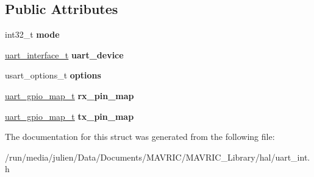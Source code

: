 \subsection*{Public Attributes}
\begin{DoxyCompactItemize}
\item 
\hypertarget{structusart__config__t_a760c7c5f7792f1a8e853808d96127b6b}{int32\+\_\+t {\bfseries mode}}\label{structusart__config__t_a760c7c5f7792f1a8e853808d96127b6b}

\item 
\hypertarget{structusart__config__t_ad3699e063b4c489ba17ab4b6dcf7d5d0}{\hyperlink{structuart__interface__t}{uart\+\_\+interface\+\_\+t} {\bfseries uart\+\_\+device}}\label{structusart__config__t_ad3699e063b4c489ba17ab4b6dcf7d5d0}

\item 
\hypertarget{structusart__config__t_a15823e7e6a47b593c504d386c71a71d9}{usart\+\_\+options\+\_\+t {\bfseries options}}\label{structusart__config__t_a15823e7e6a47b593c504d386c71a71d9}

\item 
\hypertarget{structusart__config__t_aa68a21521136b0fed146cd833c84d379}{\hyperlink{structuart__gpio__map__t}{uart\+\_\+gpio\+\_\+map\+\_\+t} {\bfseries rx\+\_\+pin\+\_\+map}}\label{structusart__config__t_aa68a21521136b0fed146cd833c84d379}

\item 
\hypertarget{structusart__config__t_a593ba45e51d8b9e4116a1ce6933b67c1}{\hyperlink{structuart__gpio__map__t}{uart\+\_\+gpio\+\_\+map\+\_\+t} {\bfseries tx\+\_\+pin\+\_\+map}}\label{structusart__config__t_a593ba45e51d8b9e4116a1ce6933b67c1}

\end{DoxyCompactItemize}


The documentation for this struct was generated from the following file\+:\begin{DoxyCompactItemize}
\item 
/run/media/julien/\+Data/\+Documents/\+M\+A\+V\+R\+I\+C/\+M\+A\+V\+R\+I\+C\+\_\+\+Library/hal/uart\+\_\+int.\+h\end{DoxyCompactItemize}
